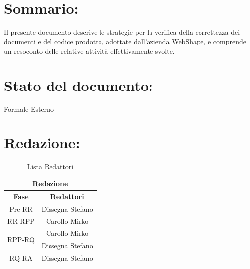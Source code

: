 \newpage
 
\begin{center} %
  \begin{Huge}  
        \textbf{\TITOLODOC}
      \\
  \end{Huge}
\end{center}
 
\section*{\LARGE Sommario:} %
\indent \indent
Il presente documento descrive le strategie per la verifica della correttezza dei documenti e del codice prodotto, adottate dall'azienda WebShape, e comprende un resoconto delle relative attivit\`a effettivamente svolte.
 
\section*{\LARGE Stato del documento:}
\indent \indent
  Formale Esterno
 
\section*{\LARGE Redazione:}
  \begin{table}[!h]
    \begin{center}
      \begin{tabular}
        {|c|c|}
        \hline
        \multicolumn{2}{|c|}{ \textbf{Redazione} } \\
        \hline
        \textbf{Fase} & \textbf{Redattori} \\
        \hline
        Pre-RR & Dissegna Stefano\\
        \hline
        RR-RPP & Carollo Mirko\\
        
        \hline
        \multirow{2}{*}{RPP-RQ} & Carollo Mirko \\
							& Dissegna Stefano \\
        
        \hline
        \multirow{1}{*}{RQ-RA} & Dissegna Stefano \\
        \hline

      \end{tabular}
      \caption{Lista Redattori} %
      \label{tabredazione}
    \end{center}
  \end{table}  
 
